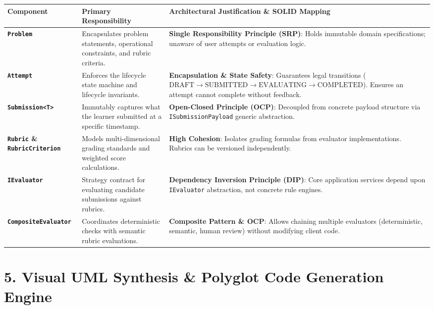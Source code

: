 \documentclass[10pt,a4paper]{article}
\begin{document}
\begin{table}[h!]
\small
\centering
\begin{tabularx}{\textwidth}{l p{4.2cm} X}
\toprule
\textbf{Component} & \textbf{Primary Responsibility} & \textbf{Architectural Justification \& SOLID Mapping} \\
\midrule
\textbf{\texttt{Problem}} & Encapsulates problem statements, operational constraints, and rubric criteria. & \textbf{Single Responsibility Principle (SRP)}: Holds immutable domain specifications; unaware of user attempts or evaluation logic. \\
\addlinespace[3pt]
\textbf{\texttt{Attempt}} & Enforces the lifecycle state machine and lifecycle invariants. & \textbf{Encapsulation \& State Safety}: Guarantees legal transitions ($\text{DRAFT} \rightarrow \text{SUBMITTED} \rightarrow \text{EVALUATING} \rightarrow \text{COMPLETED}$). Ensures an attempt cannot complete without feedback. \\
\addlinespace[3pt]
\textbf{\texttt{Submission<T>}} & Immutably captures what the learner submitted at a specific timestamp. & \textbf{Open-Closed Principle (OCP)}: Decoupled from concrete payload structure via \texttt{ISubmissionPayload} generic abstraction. \\
\addlinespace[3pt]
\textbf{\texttt{Rubric} \& \texttt{RubricCriterion}} & Models multi-dimensional grading standards and weighted score calculations. & \textbf{High Cohesion}: Isolates grading formulas from evaluator implementations. Rubrics can be versioned independently. \\
\addlinespace[3pt]
\textbf{\texttt{IEvaluator}} & Strategy contract for evaluating candidate submissions against rubrics. & \textbf{Dependency Inversion Principle (DIP)}: Core application services depend upon \texttt{IEvaluator} abstraction, not concrete rule engines. \\
\addlinespace[3pt]
\textbf{\texttt{CompositeEvaluator}} & Coordinates deterministic checks with semantic rubric evaluations. & \textbf{Composite Pattern \& OCP}: Allows chaining multiple evaluators (deterministic, semantic, human review) without modifying client code. \\
\bottomrule
\end{tabularx}
\end{table}

\section{5. Visual UML Synthesis \& Polyglot Code Generation Engine}
\end{document}
